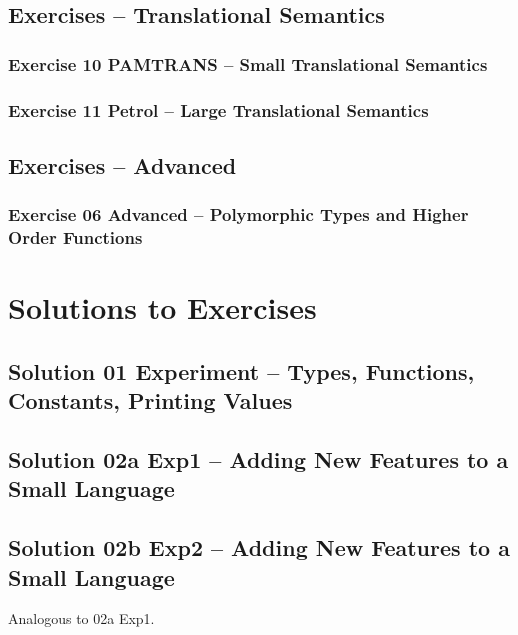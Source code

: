 \documentclass[10pt,a4]{article}
\begin{document}
\subsection*{Exercises – Translational Semantics}
\subsubsection*{Exercise 10 PAMTRANS – Small Translational Semantics}
\lstset{language=}

\lstset{language=modelica}

\subsubsection*{Exercise 11 Petrol – Large Translational Semantics}
\lstset{language=}

\lstset{language=modelica}

\subsection*{Exercises – Advanced}
\subsubsection*{Exercise 06 Advanced – Polymorphic Types and Higher Order Functions}
\lstset{language=}

\lstset{language=modelica}

\section*{Solutions to Exercises}

\subsection*{Solution 01 Experiment – Types, Functions, Constants, Printing Values}


\subsection*{Solution 02a Exp1 –  Adding New Features to a Small Language}


\subsection*{Solution 02b Exp2 –  Adding New Features to a Small Language}
Analogous to 02a Exp1.
\end{document}
